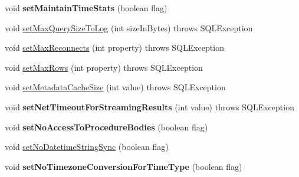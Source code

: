 \begin{DoxyCompactItemize}
\item 
\mbox{\label{classcom_1_1mysql_1_1jdbc_1_1_multi_host_my_s_q_l_connection_a8e86b0d9e8c85b1e055b358260d0ad53}} 
void {\bfseries set\+Maintain\+Time\+Stats} (boolean flag)
\item 
void \mbox{\hyperlink{classcom_1_1mysql_1_1jdbc_1_1_multi_host_my_s_q_l_connection_af7d68fcc0013bf2144e290097365b6ea}{set\+Max\+Query\+Size\+To\+Log}} (int size\+In\+Bytes)  throws S\+Q\+L\+Exception 
\item 
void \mbox{\hyperlink{classcom_1_1mysql_1_1jdbc_1_1_multi_host_my_s_q_l_connection_a3f763d84919c40ae00d9d76bc53ac78e}{set\+Max\+Reconnects}} (int property)  throws S\+Q\+L\+Exception 
\item 
void \mbox{\hyperlink{classcom_1_1mysql_1_1jdbc_1_1_multi_host_my_s_q_l_connection_a15920ec9b291f698817ea82c8ecabfbe}{set\+Max\+Rows}} (int property)  throws S\+Q\+L\+Exception 
\item 
void \mbox{\hyperlink{classcom_1_1mysql_1_1jdbc_1_1_multi_host_my_s_q_l_connection_a2403357756bbbdea09d2773f42ea3501}{set\+Metadata\+Cache\+Size}} (int value)  throws S\+Q\+L\+Exception 
\item 
\mbox{\label{classcom_1_1mysql_1_1jdbc_1_1_multi_host_my_s_q_l_connection_aaf906523249fdb45fe492182b1ea673a}} 
void {\bfseries set\+Net\+Timeout\+For\+Streaming\+Results} (int value)  throws S\+Q\+L\+Exception 
\item 
\mbox{\label{classcom_1_1mysql_1_1jdbc_1_1_multi_host_my_s_q_l_connection_ab9e3ba75d40011e14039483864a7c052}} 
void {\bfseries set\+No\+Access\+To\+Procedure\+Bodies} (boolean flag)
\item 
void \mbox{\hyperlink{classcom_1_1mysql_1_1jdbc_1_1_multi_host_my_s_q_l_connection_a1996dbebf438d31e262c88898b0fbba0}{set\+No\+Datetime\+String\+Sync}} (boolean flag)
\item 
\mbox{\label{classcom_1_1mysql_1_1jdbc_1_1_multi_host_my_s_q_l_connection_ae10d9fb04b8d43f22ed620739c6a84c9}} 
void {\bfseries set\+No\+Timezone\+Conversion\+For\+Time\+Type} (boolean flag)
\item 
\mbox{\label{classcom_1_1mysql_1_1jdbc_1_1_multi_host_my_s_q_l_connection_a2bb1cacdd0dbe78aa0100eb838dc660b}} 

\end{DoxyCompactItemize}
